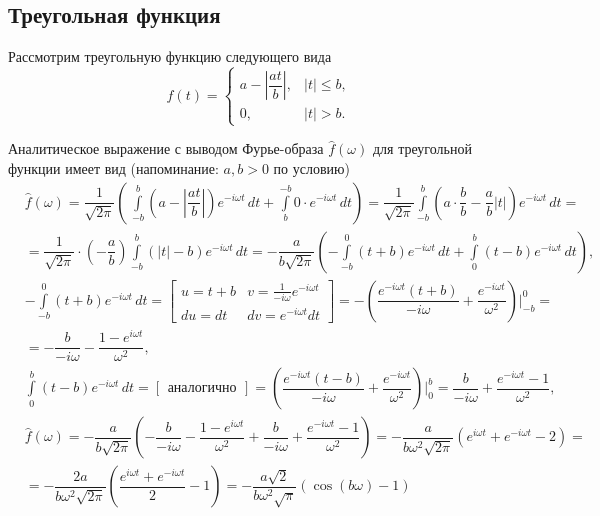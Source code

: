 \documentclass[a4paper, 16pt]{article}
\begin{document}
    \subsection{Треугольная функция}
    \noindent Рассмотрим треугольную функцию следующего вида
    $$
    f(t)=
    \begin{cases}
        a-\left|\dfrac{at}{b}\right|, & \left|t\right|\leq b,\\
        0, & \left|t\right|>b.
    \end{cases}
    $$


    \noindent Аналитическое выражение с выводом Фурье-образа
    $\hat{f}(\omega)$ для треугольной функции имеет вид (напоминание: $a,b>0$ по условию)
    \begin{align*}
        & \hat{f}(\omega)=\dfrac{1}{\sqrt{2\pi}}\left(\,\int\limits_{-b}^{b}\left(a-\left|\dfrac{at}{b}\right|\right)e^{-i\omega t}\,dt+\int\limits_{b}^{-b}0\cdot e^{-i\omega t}\,dt\right)=
        \dfrac{1}{\sqrt{2\pi}}\int\limits_{-b}^{b}\left(a\cdot\dfrac{b}{b}-\dfrac{a}{b}|t|\right)e^{-i\omega t}\,dt=\\
        & = \dfrac{1}{\sqrt{2\pi}}\cdot\left(-\dfrac{a}{b}\right)\int\limits_{-b}^{b}(|t|-b)e^{-i\omega t}\,dt=-\dfrac{a}{b\sqrt{2\pi}}\left(-\int\limits_{-b}^{0}(t+b)e^{-i\omega t}\,dt+\int\limits_{0}^{b}(t-b)e^{-i\omega t}\,dt\right),\\
        & -\int\limits_{-b}^{0}(t+b)e^{-i\omega t}\,dt=
        \begin{bmatrix}
            u=t+b &v=\frac{1}{-i\omega}e^{-i\omega t}\\
            du=dt &dv=e^{-i\omega t}dt
        \end{bmatrix}=
        -\left(\dfrac{e^{-i\omega t}(t+b)}{-i\omega}+\dfrac{e^{-i\omega t}}{\omega^2}\right)\bigg|_{-b}^{0}=\\
        & =-\dfrac{b}{-i\omega}-\dfrac{1-e^{i\omega t}}{\omega^2},\\
        & \int\limits_{0}^{b}(t-b)e^{-i\omega t}\,dt=
        \begin{bmatrix}
            \text{аналогично}
        \end{bmatrix}=
        \left(\dfrac{e^{-i\omega t}(t-b)}{-i\omega}+\dfrac{e^{-i\omega t}}{\omega^2}\right)\bigg|_{0}^{b}=
        \dfrac{b}{-i\omega}+\dfrac{e^{-i\omega t}-1}{\omega^2},\\
        & \hat{f}(\omega)=-\dfrac{a}{b\sqrt{2\pi}}\left(-\dfrac{b}{-i\omega}-\dfrac{1-e^{i\omega t}}{\omega^2}+\dfrac{b}{-i\omega}+\dfrac{e^{-i\omega t}-1}{\omega^2}\right)=
        -\dfrac{a}{b\omega^2\sqrt{2\pi}}\left(e^{i\omega t}+e^{-i\omega t}-2\right)=\\
        & =-\dfrac{2a}{b\omega^2\sqrt{2\pi}}\left(\dfrac{e^{i\omega t}+e^{-i\omega t}}{2}-1\right)=
        -\dfrac{a\sqrt{2}}{b\omega^2\sqrt{\pi}}\left(\cos{(b\omega)}-1\right)
    \end{align*}
\end{document}
